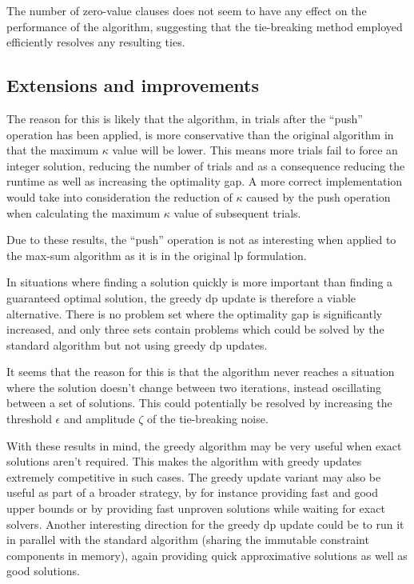 The number of zero-value clauses does not seem to have any effect on the performance of the algorithm, suggesting that the tie-breaking method employed efficiently resolves any resulting ties.



\subsection{Extensions and improvements}




The reason for this is likely that the algorithm, in trials after the \enquote{push} operation has been applied, is more conservative than the original algorithm in that the maximum \(\kappa\) value will be lower. This means more trials fail to force an integer solution, reducing the number of trials and as a consequence reducing the runtime as well as increasing the optimality gap.
A more correct implementation would take into consideration the reduction of \(\kappa\) caused by the push operation when calculating the maximum \(\kappa\) value of subsequent trials.

Due to these results, the \enquote{push} operation is not as interesting when applied to the max-sum algorithm as it is in the original \gls{lp} formulation.



In situations where finding a solution quickly is more important than finding a guaranteed optimal solution, the greedy \gls{dp} update is therefore a viable alternative.
There is no problem set where the optimality gap is significantly increased, and only three sets contain problems which could be solved by the standard algorithm but not using greedy \gls{dp} updates.


It seems that the reason for this is that the algorithm never reaches a situation where the solution doesn't change between two iterations, instead oscillating between a set of solutions.
This could potentially be resolved by increasing the threshold \(\epsilon\) and amplitude \(\zeta\) of the tie-breaking noise.

With these results in mind, the greedy algorithm may be very useful when exact solutions aren't required.
This makes the algorithm with greedy updates extremely competitive in such cases.
The greedy update variant may also be useful as part of a broader strategy, by for instance providing fast and good upper bounds or by providing fast unproven solutions while waiting for exact solvers.
Another interesting direction for the greedy \gls{dp} update could be to run it in parallel with the standard algorithm (sharing the immutable constraint components in memory), again providing quick approximative solutions as well as good solutions.

